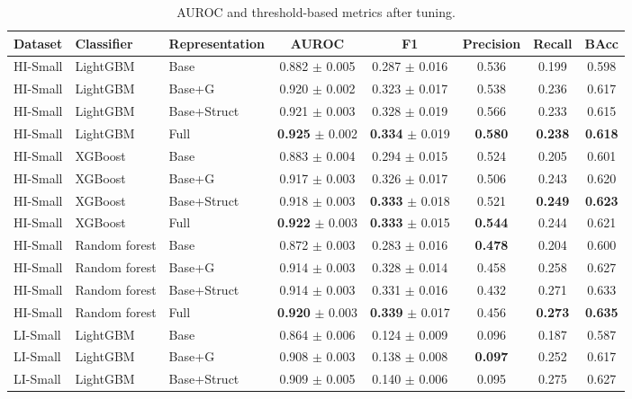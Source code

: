 \begin{table}[htbp]
\centering
\footnotesize
\caption{AUROC and threshold-based metrics after tuning.}
\label{tab:threshold}
\setlength{\tabcolsep}{4pt}
\begin{threeparttable}
\begin{tabular}{lllccccc}
\toprule
Dataset & Classifier & Representation & AUROC & F1 & Precision & Recall & BAcc \\
\midrule
HI-Small & LightGBM & Base & 0.882 $\pm$ 0.005 & 0.287 $\pm$ 0.016 & 0.536 & 0.199 & 0.598 \\
HI-Small & LightGBM & Base+G & 0.920 $\pm$ 0.002 & 0.323 $\pm$ 0.017 & 0.538 & 0.236 & 0.617 \\
HI-Small & LightGBM & Base+Struct & 0.921 $\pm$ 0.003 & 0.328 $\pm$ 0.019 & 0.566 & 0.233 & 0.615 \\
HI-Small & LightGBM & Full & \textbf{0.925} $\pm$ 0.002 & \textbf{0.334} $\pm$ 0.019 & \textbf{0.580} & \textbf{0.238} & \textbf{0.618} \\
HI-Small & XGBoost & Base & 0.883 $\pm$ 0.004 & 0.294 $\pm$ 0.015 & 0.524 & 0.205 & 0.601 \\
HI-Small & XGBoost & Base+G & 0.917 $\pm$ 0.003 & 0.326 $\pm$ 0.017 & 0.506 & 0.243 & 0.620 \\
HI-Small & XGBoost & Base+Struct & 0.918 $\pm$ 0.003 & \textbf{0.333} $\pm$ 0.018 & 0.521 & \textbf{0.249} & \textbf{0.623} \\
HI-Small & XGBoost & Full & \textbf{0.922} $\pm$ 0.003 & \textbf{0.333} $\pm$ 0.015 & \textbf{0.544} & 0.244 & 0.621 \\
HI-Small & Random forest & Base & 0.872 $\pm$ 0.003 & 0.283 $\pm$ 0.016 & \textbf{0.478} & 0.204 & 0.600 \\
HI-Small & Random forest & Base+G & 0.914 $\pm$ 0.003 & 0.328 $\pm$ 0.014 & 0.458 & 0.258 & 0.627 \\
HI-Small & Random forest & Base+Struct & 0.914 $\pm$ 0.003 & 0.331 $\pm$ 0.016 & 0.432 & 0.271 & 0.633 \\
HI-Small & Random forest & Full & \textbf{0.920} $\pm$ 0.003 & \textbf{0.339} $\pm$ 0.017 & 0.456 & \textbf{0.273} & \textbf{0.635} \\
\addlinespace
LI-Small & LightGBM & Base & 0.864 $\pm$ 0.006 & 0.124 $\pm$ 0.009 & 0.096 & 0.187 & 0.587 \\
LI-Small & LightGBM & Base+G & 0.908 $\pm$ 0.003 & 0.138 $\pm$ 0.008 & \textbf{0.097} & 0.252 & 0.617 \\
LI-Small & LightGBM & Base+Struct & 0.909 $\pm$ 0.005 & 0.140 $\pm$ 0.006 & 0.095 & 0.275 & 0.627 \\

\end{tabular}
\end{threeparttable}
\end{table}
